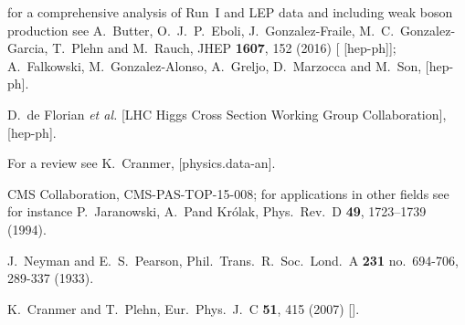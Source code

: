 
  for a comprehensive analysis of Run~I and LEP data and including weak boson production see \eg 
  A.~Butter, O.~J.~P.~Eboli, J.~Gonzalez-Fraile, M.~C.~Gonzalez-Garcia, T.~Plehn and M.~Rauch,
  JHEP {\bf 1607}, 152 (2016)
  [ [hep-ph]];
  A.~Falkowski, M.~Gonzalez-Alonso, A.~Greljo, D.~Marzocca and M.~Son,
   [hep-ph].

  D.~de Florian {\it et al.} [LHC Higgs Cross Section Working Group Collaboration],
   [hep-ph].

  For a review see \eg
  K.~Cranmer,
   [physics.data-an].

  CMS Collaboration,
  CMS-PAS-TOP-15-008;
  for applications in other fields see for instance
  P.~Jaranowski, A.~Pand Kr\'olak,
  Phys.\ Rev.\ D {\bf 49}, 1723–1739 (1994).

  J.~Neyman and E.~S.~Pearson,
  Phil.\ Trans.\ R.\ Soc.\ Lond.\ A {\bf 231} no.~694-706, 289-337 (1933).

  K.~Cranmer and T.~Plehn,
  Eur.\ Phys.\ J.\ C {\bf 51}, 415 (2007)
  [].

